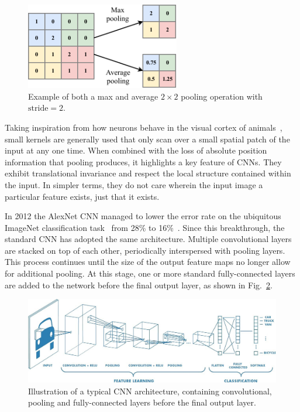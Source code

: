 \begin{figure} %
    \includegraphics[width=0.6\textwidth]{diagrams/6-cvn/pooling.pdf}
    \caption[Example of pooling operation.]
    {Example of both a max and average $2 \times 2$ pooling operation with $\mathrm{stride}=2$.}
    \label{fig:pooling}
\end{figure}

Taking inspiration from how neurons behave in the visual cortex of animals~\cite{lecun2015}, small
kernels are generally used that only scan over a small spatial patch of the input at any one time.
When combined with the loss of absolute position information that pooling produces, it highlights
a key feature of CNNs. They exhibit translational invariance and respect the local structure
contained within the input. In simpler terms, they do not care wherein the input image a
particular feature exists, just that it exists.

In 2012 the AlexNet CNN managed to lower the error rate on the ubiquitous ImageNet classification
task~\cite{deng2009} from 28\% to 16\%~\cite{krizhevsky2012}. Since this breakthrough, the
standard CNN has adopted the same architecture. Multiple convolutional layers are stacked on top
of each other, periodically interspersed with pooling layers. This process continues until the
size of the output feature maps no longer allow for additional pooling. At this stage, one or more
standard fully-connected layers are added to the network before the final output layer, as shown
in Fig.~\ref{fig:conv_diagram}.

\begin{figure} %
    \includegraphics[width=\textwidth]{diagrams/6-cvn/conv_diagram.jpeg}
    \caption[Typical CNN architecture]
    {Illustration of a typical CNN architecture, containing convolutional, pooling and
        fully-connected layers before the final output layer.}
    \label{fig:conv_diagram}
\end{figure}

